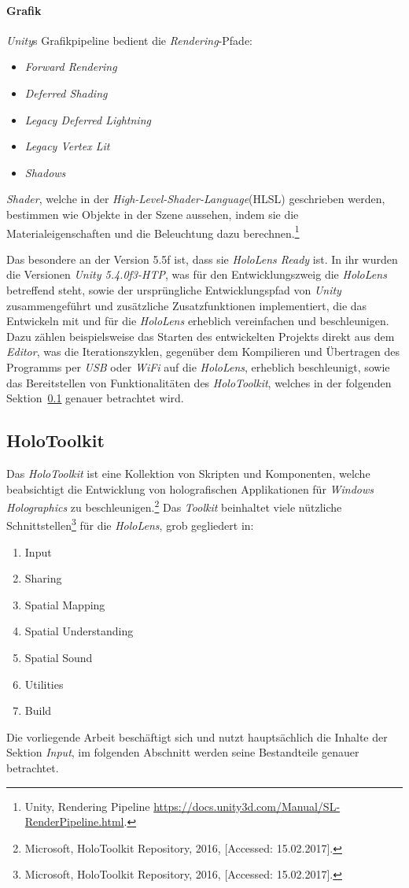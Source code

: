 \paragraph*{Grafik}
\textit{Unity}s Grafikpipeline bedient die \textit{Rendering}-Pfade:
\begin{itemize}
	\item \textit{Forward Rendering}
	\item \textit{Deferred Shading}
	\item \textit{Legacy Deferred Lightning}
	\item \textit{Legacy Vertex Lit}
	\item \textit{Shadows}
\end{itemize}

\textit{Shader}, welche in der \textit{High-Level-Shader-Language}(HLSL) geschrieben werden, bestimmen wie Objekte in der Szene aussehen, indem sie die Materialeigenschaften und die Beleuchtung dazu berechnen.\footnote{ Unity, Rendering Pipeline \url{https://docs.unity3d.com/Manual/SL-RenderPipeline.html}.}

Das besondere an der Version 5.5f ist, dass sie \textit{HoloLens Ready} ist. In ihr wurden die Versionen \textit{Unity 5.4.0f3-HTP}, was für den Entwicklungszweig die \textit{HoloLens} betreffend steht, sowie der ursprüngliche Entwicklungspfad von \textit{Unity} zusammengeführt und zusätzliche Zusatzfunktionen implementiert, die das Entwickeln mit und für die \textit{HoloLens} erheblich vereinfachen und beschleunigen. Dazu zählen beispielsweise das Starten des entwickelten Projekts direkt aus dem \textit{Editor}, was die Iterationszyklen, gegenüber dem Kompilieren und Übertragen des Programms per \textit{USB} oder \textit{WiFi} auf die \textit{HoloLens}, erheblich beschleunigt, sowie das Bereitstellen von Funktionalitäten des \textit{HoloToolkit}, welches in der folgenden Sektion~\ref{ssec:HoloToolkit} genauer betrachtet wird.
\subsection{HoloToolkit}\label{ssec:HoloToolkit}
Das \textit{HoloToolkit} ist \frqq eine Kollektion von Skripten und Komponenten, welche beabsichtigt die Entwicklung von holografischen Applikationen für \textit{Windows Holographics} zu beschleunigen.\flqq\footnote{ Microsoft, HoloToolkit Repository, 2016, [Accessed: 15.02.2017].} Das \textit{Toolkit} beinhaltet viele nützliche Schnittstellen\footnote{ Microsoft, HoloToolkit Repository, 2016, [Accessed: 15.02.2017].} für die \textit{HoloLens}, grob gegliedert in: 
\begin{enumerate}
	\item Input
	\item Sharing
	\item Spatial Mapping
	\item Spatial Understanding
	\item Spatial Sound
	\item Utilities
	\item Build
\end{enumerate}
Die vorliegende Arbeit beschäftigt sich und nutzt hauptsächlich die Inhalte der Sektion \textit{Input}, im folgenden Abschnitt werden seine Bestandteile genauer betrachtet.
